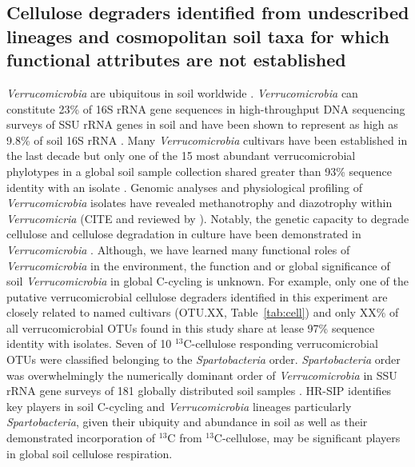 \subsection{Cellulose degraders identified from undescribed lineages and
    cosmopolitan soil taxa for which functional attributes are not established}
\textit{Verrucomicrobia} are ubiquitous in soil worldwide
\citep{Bergmann_2011}.  \textit{Verrucomicrobia} can constitute 23\% of 16S
rRNA gene sequences in high-throughput DNA sequencing surveys of SSU rRNA genes
in soil \citep{Bergmann_2011} and have been shown to represent as high as 9.8\%
of soil 16S rRNA \citep{Buckley_2001}. Many \textit{Verrucomicrobia} cultivars
have been established in the last decade \cite{Wertz_2011} but only one of the
15 most abundant verrucomicrobial phylotypes in a global soil sample collection
shared greater than 93\% sequence identity with an isolate
\citep{Bergmann_2011}.  Genomic analyses and physiological profiling of
\textit{Verrucomicrobia} isolates have revealed methanotrophy and diazotrophy
\citep{Wertz_2011} within \textit{Verrucomicria} (CITE and reviewed by
\citet{Wertz_2011}). Notably, the genetic capacity to degrade cellulose and
cellulose degradation in culture have been demonstrated in
\textit{Verrucomicrobia} \citep{Otsuka_2012, Wertz_2011}.  Although, we have
learned many functional roles of \textit{Verrucomicrobia} in the environment,
the function and or global significance of soil \textit{Verrucomicrobia} in
global C-cycling is unknown. For example, only one of the putative
verrucomicrobial cellulose degraders identified in this experiment are closely
related to named cultivars (OTU.XX, Table~\ref{tab:cell}) and only XX\% of all
verrucomicrobial OTUs found in this study share at lease 97\% sequence identity
with isolates. Seven of 10 $^{13}$C-cellulose responding verrucomicrobial OTUs
were classified belonging to the \textit{Spartobacteria} order.
\textit{Spartobacteria} order was overwhelmingly the numerically dominant order
of \textit{Verrucomicrobia} in SSU rRNA gene surveys of 181 globally
distributed soil samples \citep{Bergmann_2011}. HR-SIP identifies key players
in soil C-cycling and \textit{Verrucomicrobia} lineages particularly
\textit{Spartobacteria}, given their ubiquity and abundance in soil as well as
their demonstrated incorporation of $^{13}$C from $^{13}$C-cellulose, may be
significant players in global soil cellulose respiration. 

